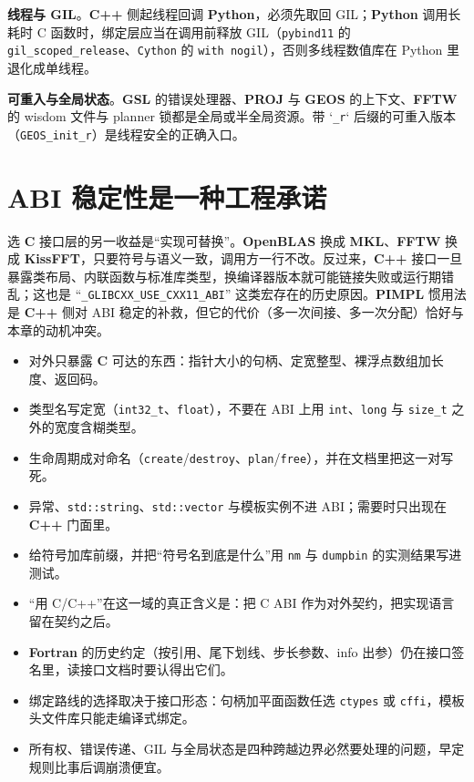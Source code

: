 \documentclass[12pt,a4paper,fontset=fandol]{ctexbook}
\newcommand{\Tp}[1]{\texttt{#1}}
\newcommand{\Bk}{\allowbreak}
\newcommand{\Lib}[1]{\textbf{#1}}
\newcommand{\Lang}[1]{\textsf{\bfseries #1}}
\newcommand{\CL}{\Lang{C}}
\newcommand{\CPP}{\Lang{C++}}
\newcommand{\FTN}{\Lang{Fortran}}
\newcommand{\PY}{\Lang{Python}}
\begin{document}
\textbf{线程与 GIL}。\CPP{} 侧起线程回调 \PY{}，必须先取回 GIL；\PY{} 调用长耗时 C 函数时，绑定层应当在调用前释放 GIL（\Tp{pybind11} 的 \Tp{gil\_scoped\_release}、\Tp{Cython} 的 \Tp{with nogil}），否则多线程数值库在 Python 里退化成单线程。

\textbf{可重入与全局状态}。\Lib{GSL} 的错误处理器、\Lib{PROJ} 与 \Lib{GEOS} 的上下文、\Lib{FFTW} 的 wisdom 文件与 planner 锁都是全局或半全局资源。带 `\Tp{\_r}` 后缀的可重入版本（\Tp{GEOS\_init\_r}）是线程安全的正确入口。

\section{ABI 稳定性是一种工程承诺}

选 \CL{} 接口层的另一收益是``实现可替换''。\Lib{OpenBLAS} 换成 \Lib{MKL}、\Lib{FFTW} 换成 \Lib{KissFFT}，只要符号与语义一致，调用方一行不改。反过来，\CPP{} 接口一旦暴露类布局、内联函数与标准库类型，换编译器版本就可能链接失败或运行期错乱；这也是 ``\Tp{\_GLIBCXX\_USE\_CXX11\_ABI}'' 这类宏存在的历史原因。\Lib{PIMPL} 惯用法是 \CPP{} 侧对 ABI 稳定的补救，但它的代价（多一次间接、多一次分配）恰好与本章的动机冲突。

\begin{bestpractice}[title={一份 C 门面头文件的写法}]
\begin{itemize}
\item 对外只暴露 \CL{} 可达的东西：指针大小的句柄、定宽整型、裸浮点数组加长度、返回码。
\item 类型名写定宽（\Tp{int32\_t}、\Tp{float}），不要在 ABI 上用 \Tp{int}、\Tp{long} 与 \Tp{size\_t} 之外的宽度含糊类型。
\item 生命周期成对命名（\Tp{create}/{\Bk}\Tp{destroy}、\Tp{plan}/{\Bk}\Tp{free}），并在文档里把这一对写死。
\item 异常、\Tp{std::string}、\Tp{std::vector} 与模板实例不进 ABI；需要时只出现在 \CPP{} 门面里。
\item 给符号加库前缀，并把``符号名到底是什么''用 \Tp{nm} 与 \Tp{dumpbin} 的实测结果写进测试。
\end{itemize}
\end{bestpractice}

\begin{guideline}[title={接口层的四条结论}]
\begin{itemize}
\item ``用 C/C++''在这一域的真正含义是：把 C ABI 作为对外契约，把实现语言留在契约之后。
\item \FTN{} 的历史约定（按引用、尾下划线、步长参数、info 出参）仍在接口签名里，读接口文档时要认得出它们。
\item 绑定路线的选择取决于接口形态：句柄加平面函数任选 \Tp{ctypes} 或 \Tp{cffi}，模板头文件库只能走编译式绑定。
\item 所有权、错误传递、GIL 与全局状态是四种跨越边界必然要处理的问题，早定规则比事后调崩溃便宜。
\end{itemize}
\end{guideline}
\end{document}
